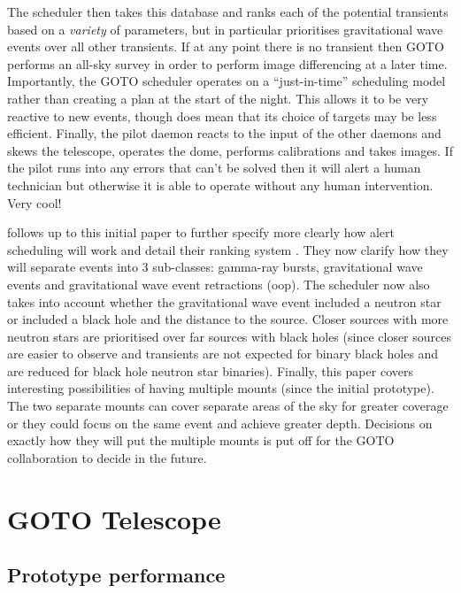 \documentclass[twocolumn]{aastex631}
\newcommand{\placeholder}[1]{{\color{gray} \lipsum[#1]}}
\begin{document}
The scheduler then takes this database and ranks each of the potential transients based on a \textit{variety} of parameters, but in particular prioritises gravitational wave events over all other transients. If at any point there is no transient then GOTO performs an all-sky survey in order to perform image differencing at a later time. Importantly, the GOTO scheduler operates on a ``just-in-time'' scheduling model rather than creating a plan at the start of the night. This allows it to be very reactive to new events, though does mean that its choice of targets may be less efficient. Finally, the pilot daemon reacts to the input of the other daemons and skews the telescope, operates the dome, performs calibrations and takes images. If the pilot runs into any errors that can't be solved then it will alert a human technician but otherwise it is able to operate without any human intervention. Very cool!

\citet{Dyer+2020} follows up to this initial paper to further specify more clearly how alert scheduling will work and detail their ranking system \citep[e.g.\ see Eq.~1][]{Dyer+2020}. They now clarify how they will separate events into 3 sub-classes: gamma-ray bursts, gravitational wave events and gravitational wave event retractions (oop). The scheduler now also takes into account whether the gravitational wave event included a neutron star or included a black hole and the distance to the source. Closer sources with more neutron stars are prioritised over far sources with black holes (since closer sources are easier to observe and transients are not expected for binary black holes and are reduced for black hole neutron star binaries). Finally, this paper covers interesting possibilities of having multiple mounts (since the initial prototype). The two separate mounts can cover separate areas of the sky for greater coverage or they could focus on the same event and achieve greater depth. Decisions on exactly how they will put the multiple mounts is put off for the GOTO collaboration to decide in the future.

\section{GOTO Telescope}
\subsection{Prototype performance}
\citet{Steeghs+2022}
\placeholder{3}

\subsection{}
\citet{GOTO+2020}
\placeholder{4}
\end{document}
